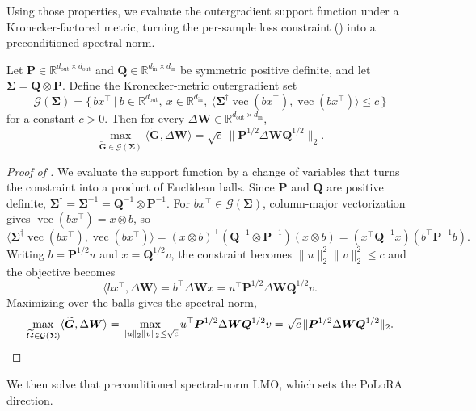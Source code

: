 \documentclass{article}
\renewcommand{\vec}{\operatorname{vec}}
\newcommand{\mat}[1]{\bm{#1}}
\newcommand{\R}{\mathbb{R}}
\newcommand{\ip}[1]{\langle #1 \rangle}
\newcommand{\norm}[1]{\| #1\|}
\newcommand{\methodname}{PoLoRA\xspace}
\begin{document}
Using those properties, we evaluate the outergradient support function under a Kronecker-factored metric, turning the per-sample loss constraint () into a preconditioned spectral norm.
\begin{lemma}
\label{lem:pseudogradient-spectral}
Let
$\mat{P}\in\R^{d_{\mathrm{out}}\times d_{\mathrm{out}}}$ and
$\mat{Q}\in\R^{d_{\mathrm{in}}\times d_{\mathrm{in}}}$ be symmetric positive definite,
and let $\mat{\Sigma}=\mat{Q}\otimes \mat{P}$. Define the Kronecker-metric outergradient set
\[
\mathcal{G}(\mat{\Sigma})=\bigl\{\, bx^\top ~\big|~ b\in\R^{d_{\mathrm{out}}},\ x\in\R^{d_{\mathrm{in}}},\ \ip{\mat{\Sigma}^\dagger\vec(bx^\top),\vec(bx^\top)}\leq c\,\bigr\}
\]
for a constant $c>0$.
Then for every $\Delta\mat{W}\in\R^{d_{\mathrm{out}}\times d_{\mathrm{in}}}$,
\[
  \max_{\widetilde{\mat{G}} \in \mathcal{G}(\mat{\Sigma})} \ip{ \widetilde{\mat{G}} , \Delta\mat{W}}
  =\sqrt{c}\,\norm{\mat{P}^{1/2}\Delta\mat{W} \mat{Q}^{1/2}}_2 .
\]
\end{lemma}

\begin{proof}[Proof of ]
We evaluate the support function by a change of variables that turns the
constraint into a product of Euclidean balls. Since $\mat{P}$ and $\mat{Q}$ are positive
definite, $\mat{\Sigma}^\dagger=\mat{\Sigma}^{-1}=\mat{Q}^{-1}\otimes \mat{P}^{-1}$. For
$bx^\top\in\mathcal{G}(\mat{\Sigma})$, column-major vectorization gives
$\vec(bx^\top)=x\otimes b$, so
\[
\ip{\mat{\Sigma}^\dagger\vec(bx^\top),\vec(bx^\top)}
=(x\otimes b)^\top(\mat{Q}^{-1}\otimes \mat{P}^{-1})(x\otimes b)
=(x^\top \mat{Q}^{-1}x)(b^\top \mat{P}^{-1}b).
\]
Writing $b=\mat{P}^{1/2}u$ and $x=\mat{Q}^{1/2}v$, the constraint becomes
$\norm{u}_2^2\norm{v}_2^2\leq c$ and the objective becomes
\[
\ip{bx^\top,\Delta\mat{W}}=b^\top\Delta\mat{W} x=u^\top \mat{P}^{1/2}\Delta\mat{W} \mat{Q}^{1/2}v .
\]
Maximizing over the balls gives the spectral norm,
\[
\max_{\widetilde{\mat{G}}\in\mathcal{G}(\mat{\Sigma})}\ip{\widetilde{\mat{G}},\Delta\mat{W}}
=\max_{\norm{u}_2\norm{v}_2\leq\sqrt{c}}u^\top \mat{P}^{1/2}\Delta\mat{W} \mat{Q}^{1/2}v
=\sqrt{c}\,\norm{\mat{P}^{1/2}\Delta\mat{W} \mat{Q}^{1/2}}_2. \qedhere
\]
\end{proof}

We then solve that preconditioned spectral-norm LMO, which sets the \methodname{} direction.
\end{document}
